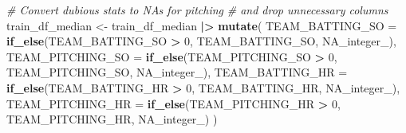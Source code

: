 \documentclass[
]{article}
\newenvironment{Shaded}{\begin{snugshade}}{\end{snugshade}}
\newcommand{\AttributeTok}[1]{\textcolor[rgb]{0.13,0.29,0.53}{#1}}
\newcommand{\CommentTok}[1]{\textcolor[rgb]{0.56,0.35,0.01}{\textit{#1}}}
\newcommand{\ConstantTok}[1]{\textcolor[rgb]{0.56,0.35,0.01}{#1}}
\newcommand{\DecValTok}[1]{\textcolor[rgb]{0.00,0.00,0.81}{#1}}
\newcommand{\FunctionTok}[1]{\textcolor[rgb]{0.13,0.29,0.53}{\textbf{#1}}}
\newcommand{\NormalTok}[1]{#1}
\newcommand{\OtherTok}[1]{\textcolor[rgb]{0.56,0.35,0.01}{#1}}
\newcommand{\SpecialCharTok}[1]{\textcolor[rgb]{0.81,0.36,0.00}{\textbf{#1}}}
\begin{document}
\begin{Shaded}
\begin{Highlighting}[]
\CommentTok{\# Convert dubious stats to NAs for pitching}
\CommentTok{\# and drop unnecessary columns}
\NormalTok{train\_df\_median }\OtherTok{\textless{}{-}}\NormalTok{ train\_df\_median }\SpecialCharTok{|\textgreater{}}
  \FunctionTok{mutate}\NormalTok{(}
    \AttributeTok{TEAM\_BATTING\_SO =} \FunctionTok{if\_else}\NormalTok{(TEAM\_BATTING\_SO }\SpecialCharTok{\textgreater{}} \DecValTok{0}\NormalTok{, TEAM\_BATTING\_SO, }\ConstantTok{NA\_integer\_}\NormalTok{),}
    \AttributeTok{TEAM\_PITCHING\_SO =} \FunctionTok{if\_else}\NormalTok{(TEAM\_PITCHING\_SO }\SpecialCharTok{\textgreater{}} \DecValTok{0}\NormalTok{, TEAM\_PITCHING\_SO, }\ConstantTok{NA\_integer\_}\NormalTok{),}
    \AttributeTok{TEAM\_BATTING\_HR =} \FunctionTok{if\_else}\NormalTok{(TEAM\_BATTING\_HR }\SpecialCharTok{\textgreater{}} \DecValTok{0}\NormalTok{, TEAM\_BATTING\_HR, }\ConstantTok{NA\_integer\_}\NormalTok{),}
    \AttributeTok{TEAM\_PITCHING\_HR =} \FunctionTok{if\_else}\NormalTok{(TEAM\_PITCHING\_HR }\SpecialCharTok{\textgreater{}} \DecValTok{0}\NormalTok{, TEAM\_PITCHING\_HR, }\ConstantTok{NA\_integer\_}\NormalTok{)}
\NormalTok{  ) }
\end{Highlighting}
\end{Shaded}
\end{document}
